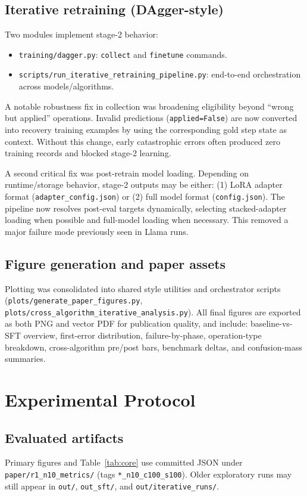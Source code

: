 \documentclass[sigplan,screen]{acmart}
\begin{document}
\subsection{Iterative retraining (DAgger-style)}
Two modules implement stage-2 behavior:
\begin{itemize}
  \item \texttt{training/dagger.py}: \texttt{collect} and \texttt{finetune} commands.
  \item \texttt{scripts/run\_iterative\_retraining\_pipeline.py}: end-to-end orchestration across models/algorithms.
\end{itemize}

A notable robustness fix in collection was broadening eligibility beyond ``wrong but applied'' operations.
Invalid predictions (\texttt{applied=False}) are now converted into recovery training examples by using the corresponding gold step state as context.
Without this change, early catastrophic errors often produced zero training records and blocked stage-2 learning.

A second critical fix was post-retrain model loading.
Depending on runtime/storage behavior, stage-2 outputs may be either:
(1) LoRA adapter format (\texttt{adapter\_config.json}) or (2) full model format (\texttt{config.json}).
The pipeline now resolves post-eval targets dynamically, selecting stacked-adapter loading when possible and full-model loading when necessary.
This removed a major failure mode previously seen in Llama runs.

\subsection{Figure generation and paper assets}
Plotting was consolidated into shared style utilities and orchestrator scripts (\texttt{plots/generate\_paper\_figures.py}, \texttt{plots/cross\_algorithm\_iterative\_analysis.py}).
All final figures are exported as both PNG and vector PDF for publication quality, and include:
baseline-vs-SFT overview, first-error distribution, failure-by-phase, operation-type breakdown, cross-algorithm pre/post bars, benchmark deltas, and confusion-mass summaries.

\section{Experimental Protocol}
\subsection{Evaluated artifacts}
Primary figures and Table~\ref{tab:core} use committed JSON under \texttt{paper/r1\_n10\_metrics/} (tags \texttt{*\_n10\_c100\_s100}).
Older exploratory runs may still appear in \texttt{out/}, \texttt{out\_sft/}, and \texttt{out/iterative\_runs/}.
\end{document}
